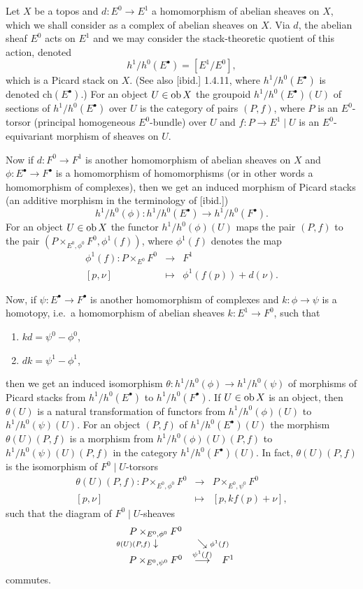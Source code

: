 \documentclass[11pt]{article}
\theoremstyle{plain}
\theoremstyle{definition}
\newcommand{\com}{^{\scriptscriptstyle\bullet}}
\newcommand{\resto}{{ \mid }}
\newcommand{\ob}{\mathop{\rm ob}}
\newcommand{\ldiag}[1]
       {\makebox[0cm]{\({\scriptstyle#1}\downarrow\phantom{\scriptstyle#1}\)}}
\newcommand{\sediagr}[1]
       {\makebox[0cm]{\(\phantom{\scriptstyle#1}\searrow{\scriptstyle#1}\)}}
\newcommand{\inversecomtri}[6]{
\begin{array}{ccc}
#1           &                                &            \\
\ldiag{#2}   & \sediagr{#3}                   &            \\
#4           & \stackrel{#5}{\longrightarrow} & #6
\end{array}}
\theoremstyle{plain}
\theoremstyle{definition}
\theoremstyle{remark}
\begin{document}
Let \(X\) be a topos and \(d:E^0\rightarrow E^1\) a homomorphism of
abelian sheaves on \(X\), which we shall consider as a complex of
abelian sheaves on \(X\). Via \(d\), the abelian sheaf \(E^0\) acts on \(E^1\)
and we may consider the stack-theoretic quotient of this action,
denoted
\[
h^1/h^0(E\com)=[E^1/E^0],
\]
which is a Picard stack on \(X\). (See also [ibid.] 1.4.11, where
\(h^1/h^0(E\com)\) is denoted \(\mbox{ch}(E\com)\).)  For an object
\(U\in\ob X\) the groupoid \(h^1/h^0(E\com)(U)\) of sections of
\(h^1/h^0(E\com)\) over \(U\) is the category of pairs \((P,f)\), where \(P\)
is an \(E^0\)-torsor (principal homogeneous \(E^0\)-bundle) over \(U\) and
\(f:P\rightarrow E^1\resto U\) is an \(E^0\)-equivariant morphism of
sheaves on \(U\).

Now if \(d:F^0\rightarrow F^1\) is another homomorphism of abelian
sheaves on \(X\) and \(\phi:E\com\rightarrow F\com\) is a homomorphism of
homomorphisms (or in other words a homomorphism of complexes), then we
get an induced morphism of Picard stacks (an additive morphism in the
terminology of [ibid.])
\[
h^1/h^0(\phi):h^1/h^0(E\com)\longrightarrow h^1/h^0(F\com).
\]
For an object
\(U\in\ob X\) the functor \(h^1/h^0(\phi)(U)\) maps the pair \((P,f)\) to the pair
\((P\times_{E^0,\phi^0}F^0,\phi^1(f))\), where \(\phi^1(f)\) denotes the map
\begin{eqnarray*}
\phi^1(f):P\times_{E^0}F^0 & \longrightarrow & F^1 \\ {[p,\nu]} & \longmapsto &
\phi^1(f(p))+d(\nu).
\end{eqnarray*}

Now, if \(\psi:E\com\rightarrow F\com\) is another homomorphism of complexes and
\(k:\phi\rightarrow\psi\) is a homotopy, i.e.\ a homomorphism of abelian sheaves
\(k:E^1\rightarrow F^0\), such that
\begin{enumerate}
\item \(kd=\psi^0-\phi^0\),
\item \(dk=\psi^1-\phi^1\),
\end{enumerate} then we get an induced isomorphism
\(\theta:h^1/h^0(\phi)\rightarrow h^1/h^0(\psi)\) of morphisms of Picard
stacks from \(h^1/h^0(E\com)\) to \(h^1/h^0(F\com)\). If \(U\in\ob X\) is an
object, then \(\theta(U)\) is a natural transformation of functors from
\(h^1/h^0(\phi)(U)\) to \(h^1/h^0(\psi)(U)\). For an object \((P,f)\) of
\(h^1/h^0(E\com)(U)\) the morphism \(\theta(U)(P,f)\) is a morphism from
\(h^1/h^0(\phi)(U)(P,f)\) to \(h^1/h^0(\psi)(U)(P,f)\) in the category
\(h^1/h^0(F\com)(U)\). In fact, \(\theta(U)(P,f)\) is the isomorphism of
\(F^0\resto U\)-torsors
\begin{eqnarray}
\theta(U)(P,f):P\times_{E^0,\phi^0}F^0 & \longrightarrow &
P\times_{E^0,\psi^0}F^0\\ {[p,\nu]} & \longmapsto & [p,kf(p)+\nu],\nonumber
\end{eqnarray} such that the diagram of \(F^0\resto U\)-sheaves
\[
\inversecomtri{P\times_{E^0,\phi^0}F^0}{\theta(U)(P,f)}{\phi^1(f)
}{P\times_{E^0,\psi^0}F^0}
{\psi^1(f)}{F^1}
\]
commutes.
\end{document}
